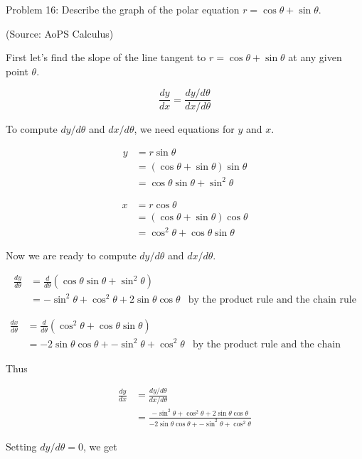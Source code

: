 Problem 16: Describe the graph of the polar equation $r = \cos \theta + \sin \theta$.

(Source: AoPS Calculus)

First let's find the slope of the line tangent to $r = \cos \theta + \sin \theta$ at any given point $\theta$.

$$ \frac{dy}{dx} = \frac{dy/d\theta}{dx/d\theta} $$

To compute $dy/d\theta$ and $dx/d\theta$, we need equations for $y$ and $x$.

\begin{align*}
y &= r \sin \theta \\
&= \left(\cos \theta + \sin \theta\right) \sin \theta \\
&= \cos \theta \sin \theta + \sin^2 \theta
\end{align*}

\begin{align*}
x &= r \cos \theta \\
&= \left(\cos \theta + \sin \theta\right) \cos \theta \\
&= \cos^2 \theta + \cos \theta \sin \theta
\end{align*}

Now we are ready to compute $dy/d\theta$ and $dx/d\theta$.

\begin{align*}
\frac{dy}{d\theta} &= \frac{d}{d\theta} \left(\cos \theta \sin \theta + \sin^2 \theta\right) \\
&= -\sin^2 \theta + \cos^2 \theta + 2 \sin \theta \cos \theta & \text{by the product rule and the chain rule}
\end{align*}

\begin{align*}
\frac{dx}{d\theta} &= \frac{d}{d\theta} \left(\cos^2 \theta + \cos \theta \sin \theta\right) \\
&= -2 \sin \theta \cos \theta + -\sin^2 \theta + \cos^2 \theta & \text{by the product rule and the chain rule}
\end{align*}

Thus

\begin{align*}
\frac{dy}{dx} &= \frac{dy/d\theta}{dx/d\theta} \\
&= \frac{-\sin^2 \theta + \cos^2 \theta + 2 \sin \theta \cos \theta}{-2 \sin \theta \cos \theta + -\sin^2 \theta + \cos^2 \theta}
\end{align*}

Setting $dy/d\theta = 0$, we get

